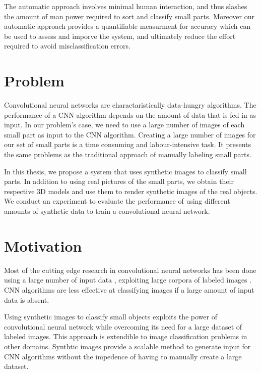 The automatic approach involves minimal human interaction, and thus slashes the amount of man power required to sort and classify small parts. Moreover our automatic approach provides a quantifiable measurment for accuracy which can be used to assess and imporve the system, and ultimately reduce the effort required to avoid misclassification errors.


\section{Problem}

Convolutional neural networks are charactaristically data-hungry algorithms. The performance of a CNN algorithm depends on the amount of data that is fed in as input. In our problem's case, we need to use a large number of images of each small part as input to the CNN algorithm. Creating a large number of images for our set of small parts is a time consuming and labour-intensive task. It presents the same problems as the traditional approach of manually labeling small parts.

In this thesis, we propose a system that uses synthetic images to classify small parts. In addition to using real pictures of the small parts, we obtain their respective 3D models and use them to render synthetic images of the real objects. We conduct an experiment to evaluate the performance of using different amounts of synthetic data to train a convolutional neural network.

\section{Motivation}

Most of the cutting edge research in convolutional neural networks has been done using a large number of input data \cite{krizhevsky2012imagenet} \cite{simonyan2014very} \cite{szegedy2015going} \cite{he2016deep}, exploiting large corpora of labeled images \cite{deng2009imagenet}. CNN algorithms are less effective at classifying images if a large amount of input data is absent.

Using synthetic images to classify small objects exploits the power of convolutional neural network while overcoming its need for a large dataset of labeled images. This approach is extendible to image classification problems in other domains. Synthtic images provide a scalable method to generate input for CNN algorithms without the impedence of having to manually create a large dataset.

